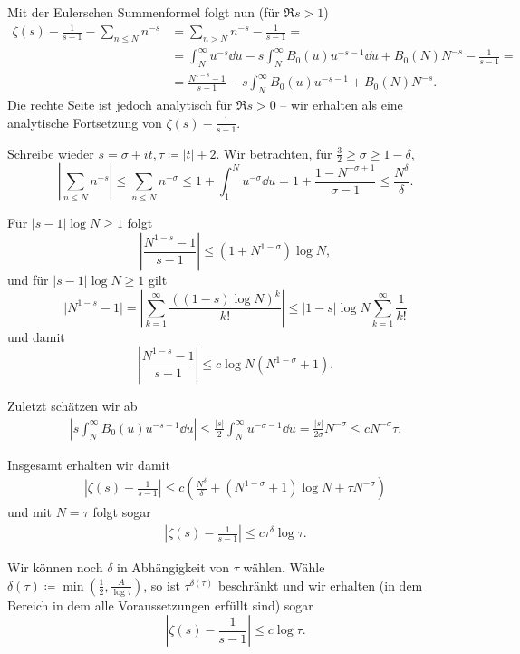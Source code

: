 \begin{remark}
    Mit der Eulerschen Summenformel folgt nun (für $\Re s > 1$)
    \begin{align*}
        \zeta(s) - \frac{1}{s-1} - \sum_{n \leq N} n^{-s} &= \sum_{n > N} n^{-s} - \frac{1}{s - 1} = \\ 
        &= \int_N^\infty u^{-s} \dd u - s \int_N^\infty B_0(u) u^{-s-1} \dd u + B_0(N) N^{-s} - \frac{1}{s-1} = \\
        &= \frac{N^{1-s} - 1}{s-1} - s \int_N^\infty B_0(u) u^{-s-1} + B_0(N) N^{-s}.
    \end{align*}
    Die rechte Seite ist jedoch analytisch für $\Re s > 0$ -- wir erhalten als eine analytische Fortsetzung von $\zeta(s) - \frac{1}{s-1}$.

    Schreibe wieder $s = \sigma + it, \tau \coloneqq \vert t \vert + 2$. Wir betrachten, für $\frac{3}{2} \geq \sigma \geq 1 - \delta$,
    $$ \left\vert \sum_{n \leq N} n^{-s} \right\vert \leq \sum_{n \leq N} n^{-\sigma} \leq 1 + \int_1^N u^{-\sigma} \dd u = 1 + \frac{1 - N^{-\sigma + 1}}{\sigma - 1} \leq \frac{N^\delta}{\delta}. $$

    Für $ \vert s-1 \vert \log N \geq 1 $ folgt
    $$ \left\vert \frac{N^{1-s} - 1}{s-1} \right\vert \leq (1 + N^{1-\sigma}) \log N, $$
    und für $ \vert s-1 \vert \log N \geq 1 $ gilt
    $$ \vert N^{1-s} - 1 \vert = \left\vert \sum_{k=1}^\infty \frac{((1-s)\log N)^k}{k!} \right\vert \leq \vert 1 - s \vert \log N \sum_{k=1}^\infty \frac{1}{k!} $$
    und damit
    $$ \left\vert \frac{N^{1-s} - 1}{s-1} \right\vert \leq c \log N (N^{1-\sigma} + 1). $$

    Zuletzt schätzen wir ab
    \begin{align*}
        \left\vert s \int_N^\infty B_0(u) u^{-s-1} \dd u \right\vert \leq \frac{\vert s \vert}{2} \int_N^\infty u^{-\sigma - 1} \dd u = \frac{\vert s \vert}{2 \sigma} N^{-\sigma} \leq c N^{-\sigma} \tau.
    \end{align*}

    Insgesamt erhalten wir damit
    \begin{align*}
        \left\vert \zeta(s) - \frac{1}{s-1} \right\vert \leq c \left( \frac{N^\delta}{\delta} + (N^{1 - \sigma} + 1) \log N + \tau N^{-\sigma} \right)
    \end{align*}
    und mit $N = \tau$ folgt sogar
    \begin{align*}
        \left\vert \zeta(s) - \frac{1}{s-1} \right\vert \leq c \tau^\delta \log \tau.
    \end{align*}

    Wir können noch $\delta$ in Abhängigkeit von $\tau$ wählen. Wähle $\delta(\tau) \coloneqq \min \left( \frac{1}{2}, \frac{A}{\log \tau} \right)$, so ist $\tau^{\delta(\tau)}$ beschränkt und wir erhalten (in dem Bereich in dem alle Voraussetzungen erfüllt sind) sogar
    $$ \left\vert \zeta(s) - \frac{1}{s-1} \right\vert \leq c \log \tau. $$
\end{remark}


